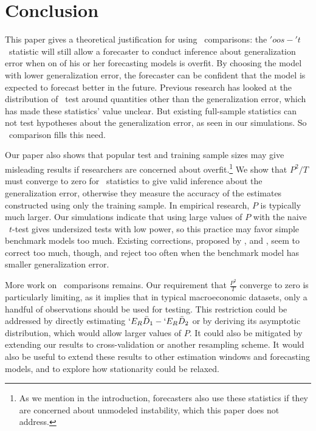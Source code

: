 \documentclass[11pt]{article}
\newcommand{\E}{`E}
\newcommand{\oost}{\ensuremath{'oos-'t}}
\begin{document}
\section{Conclusion}\label{sec:conclusion}
This paper gives a theoretical justification for using \oos\
comparisons: the \oost\ statistic will still allow a forecaster to
conduct inference about generalization error when on of his or her
forecasting models is overfit.  By choosing the model with lower
generalization error, the forecaster can be confident that the model
is expected to forecast better in the future.  Previous research has
looked at the distribution of \oos\ test around quantities other than
the generalization error, which has made these statistics' value unclear.  But
existing full-sample statistics can not test hypotheses about the
generalization error, as seen in our simulations.  So \oos\
comparison fills this need.

Our paper also shows that popular test and training sample sizes may
give misleading results if researchers are concerned about
overfit.\footnote{As we mention in the introduction, forecasters also
  use these statistics if they are concerned about unmodeled
  instability, which this paper does not address.}  We show that
$P^2/T$ must converge to zero for \oos\ statistics to give valid
inference about the generalization error, otherwise they measure the
accuracy of the estimates constructed using only the training sample.
In empirical research, $P$ is typically much larger.  Our simulations
indicate that using large values of $P$ with the naive \oos\ $t$-test
gives undersized tests with low power, so this practice may favor
simple benchmark models too much.  Existing corrections, proposed by
\citet{clark_tests_2001,clark_evaluating_2005},
\citet{mccracken_asymptotics_2007} and
\citet{clark_using_2006,clark_approximately_2007}, seem to correct too
much, though, and reject too often when the benchmark model has
smaller generalization error.

More work on \oos\ comparisons remains.  Our requirement that
$\frac{P^2}{T}$ converge to zero is particularly limiting, as it
implies that in typical macroeconomic datasets, only a handful of
observations should be used for testing.  This restriction could be
addressed by directly estimating $\E_R \bar D_1 - \E_R \bar{D}_2$ or
by deriving its asymptotic distribution, which would allow larger
values of $P$.  It could also be mitigated by extending our results to
cross-validation or another resampling scheme.  It would also be
useful to extend these results to other estimation windows and
forecasting models, and to explore how stationarity could be relaxed.
\end{document}
